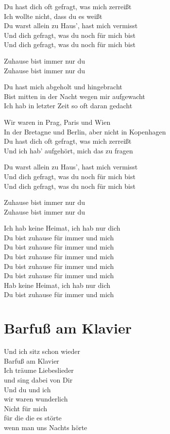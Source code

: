 \documentclass[]{book}
\begin{document}
Du hast dich oft gefragt, was mich zerreißt\\
Ich wollte nicht, dass du es weißt\\
Du warst allein zu Haus', hast mich vermisst\\
Und dich gefragt, was du noch für mich bist\\
Und dich gefragt, was du noch für mich bist

Zuhause bist immer nur du\\
Zuhause bist immer nur du

Du hast mich abgeholt und hingebracht\\
Bist mitten in der Nacht wegen mir aufgewacht\\
Ich hab in letzter Zeit so oft daran gedacht

Wir waren in Prag, Paris und Wien\\
In der Bretagne und Berlin, aber nicht in Kopenhagen\\
Du hast dich oft gefragt, was mich zerreißt\\
Und ich hab' aufgehört, mich das zu fragen

Du warst allein zu Haus', hast mich vermisst\\
Und dich gefragt, was du noch für mich bist\\
Und dich gefragt, was du noch für mich bist

Zuhause bist immer nur du\\
Zuhause bist immer nur du

Ich hab keine Heimat, ich hab nur dich\\
Du bist zuhause für immer und mich\\
Du bist zuhause für immer und mich\\
Du bist zuhause für immer und mich\\
Du bist zuhause für immer und mich\\
Du bist zuhause für immer und mich\\
Hab keine Heimat, ich hab nur dich\\
Du bist zuhause für immer und mich

\hypertarget{barfu-am-klavier-2}{%
\section{Barfuß am Klavier}\label{barfu-am-klavier-2}}

Und ich sitz schon wieder\\
Barfuß am Klavier\\
Ich träume Liebeslieder\\
und sing dabei von Dir\\
Und du und ich\\
wir waren wunderlich\\
Nicht für mich\\
für die die es störte\\
wenn man uns Nachts hörte
\end{document}
